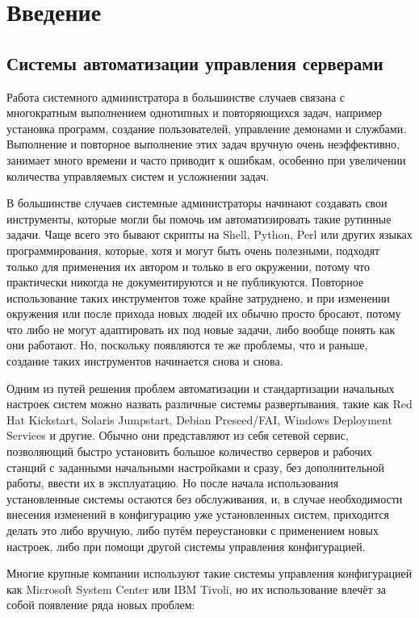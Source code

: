 \chapter{Введение}

\section{Системы автоматизации управления серверами}

	Работа системного администратора в большинстве случаев связана с многократным выполнением однотипных и повторяющихся задач, например установка программ, создание пользователей, управление демонами и службами. Выполнение и повторное выполнение этих задач вручную очень неэффективно, занимает много времени и часто приводит к ошибкам, особенно при увеличении количества управляемых систем и усложнении задач.
	
	В большинстве случаев системные администраторы начинают создавать свои инструменты, которые могли бы помочь им автоматизировать такие рутинные задачи. Чаще всего это бывают скрипты на Shell, Python, Perl или других языках программирования, которые, хотя и могут быть очень полезными, подходят только для применения их автором и только в его окружении, потому что практически никогда не документируются и не публикуются. Повторное использование таких инструментов тоже крайне затруднено, и при изменении окружения или после прихода новых людей их обычно просто бросают, потому что либо не могут адаптировать их под новые задачи, либо вообще понять как они работают. Но, поскольку появляются те же проблемы, что и раньше, создание таких инструментов начинается снова и снова.
	
	Одним из путей решения проблем автоматизации и стандартизации начальных настроек систем можно назвать различные системы развертывания, такие как Red Hat Kickstart, Solaris Jumpstart, Debian Preseed/FAI, Windows Deployment Services и другие. Обычно они представляют из себя сетевой сервис, позволяющий быстро установить большое количество серверов и рабочих станций с заданными начальными настройками и сразу, без дополнительной работы, ввести их в эксплуатацию. Но после начала использования установленные системы остаются без обслуживания, и, в случае необходимости внесения изменений в конфигурацию уже установленных систем, приходится делать это либо вручную, либо путём переустановки с применением новых настроек, либо при помощи другой системы управления конфигурацией.
	
	Многие крупные компании используют такие системы управления конфигурацией как Microsoft System Center или IBM Tivoli, но их использование влечёт за собой появление ряда новых проблем:

